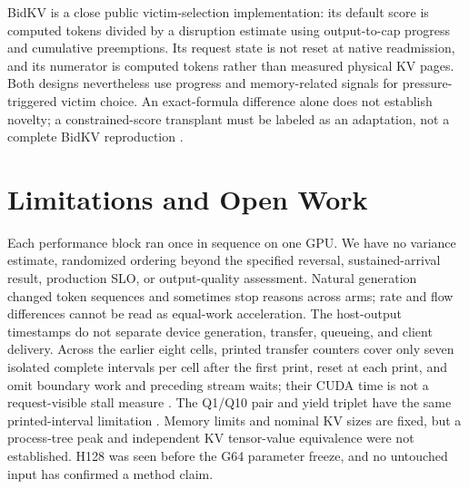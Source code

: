 \documentclass[10pt]{article}
\begin{document}
BidKV is a close public victim-selection implementation: its default score is computed tokens divided by a disruption estimate using output-to-cap progress and cumulative preemptions. Its request state is not reset at native readmission, and its numerator is computed tokens rather than measured physical KV pages. Both designs nevertheless use progress and memory-related signals for pressure-triggered victim choice. An exact-formula difference alone does not establish novelty; a constrained-score transplant must be labeled as an adaptation, not a complete BidKV reproduction \cite{bidkvcode}.

\section{Limitations and Open Work}
Each performance block ran once in sequence on one GPU. We have no variance estimate, randomized ordering beyond the specified reversal, sustained-arrival result, production SLO, or output-quality assessment. Natural generation changed token sequences and sometimes stop reasons across arms; rate and flow differences cannot be read as equal-work acceleration. The host-output timestamps do not separate device generation, transfer, queueing, and client delivery. Across the earlier eight cells, printed transfer counters cover only seven isolated complete intervals per cell after the first print, reset at each print, and omit boundary work and preceding stream waits; their CUDA time is not a request-visible stall measure \cite{printedtransfers}. The Q1/Q10 pair and yield triplet have the same printed-interval limitation \cite{capacityqtransfers,yieldtransfers}. Memory limits and nominal KV sizes are fixed, but a process-tree peak and independent KV tensor-value equivalence were not established. H128 was seen before the G64 parameter freeze, and no untouched input has confirmed a method claim.
\end{document}
